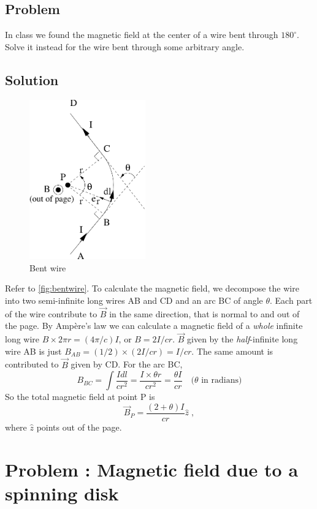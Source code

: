 \documentclass[solutions]{esg8022pset}
\begin{document}
\subsection{Problem}
  In class we found the magnetic field at the center of a wire bent through
  $180^\circ$.  Solve it instead for the wire bent through some arbitrary
  angle.
\subsection{Solution}
  \begin{figure}[H]
    \centering
    \includegraphics[width = 5cm]{BS1v05}
    \caption{Bent wire}
    \label{fig:bentwire}
  \end{figure}

  Refer to \autoref{fig:bentwire}.  To calculate the magnetic field, we
  decompose the wire into two semi-infinite long wires AB and CD and an arc BC
  of angle $\theta$.  Each part of the wire contribute to $\vec{B}$ in the same
  direction, that is normal to and out of the page.  By Amp\`{e}re's law we can
  calculate a magnetic field of a \emph{whole} infinite long wire $B\times 2\pi
  r=(4\pi/c)I$, or $B=2I/cr$.   $\vec{B}$ given by the \emph{half}-infinite
  long wire AB is just $B_{AB}=(1/2)\times (2I/cr)=I/cr$.  The same amount is
  contributed to $\vec{B}$ given by CD.  For the arc BC,
  \begin{equation}
    B_{BC}=\int\frac{Idl}{cr^2}=\frac{I\times \theta r}{cr^2}=\frac{\theta I}{cr}\quad\text{($\theta$ in radians)}
  \end{equation}
  So the total magnetic field at point P is
  \begin{equation}
    \vec B_P=\frac{(2+\theta)I}{cr}\hat z\;,
  \end{equation}
  where $\hat z$ points out of the page.
\section{Problem \thesection: Magnetic field due to a spinning disk}
\end{document}
